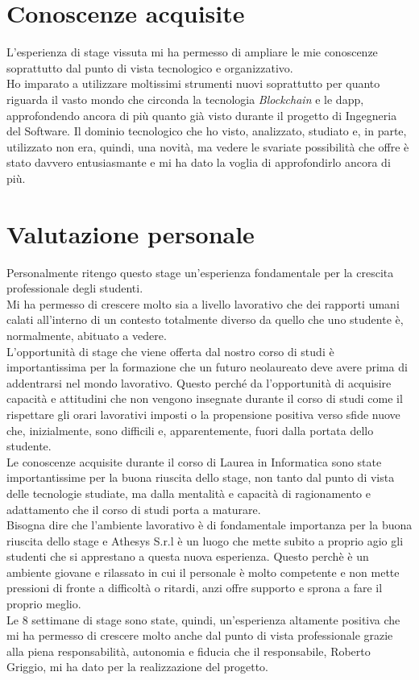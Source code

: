 \section{Conoscenze acquisite}
L'esperienza di stage vissuta mi ha permesso di ampliare le mie conoscenze soprattutto dal punto di vista tecnologico e organizzativo.\\
Ho imparato a utilizzare moltissimi strumenti nuovi soprattutto per quanto riguarda il vasto mondo che circonda la tecnologia \textit{Blockchain} e le \gls{dapp}, approfondendo ancora di più quanto già visto durante il progetto di Ingegneria del Software. Il dominio tecnologico che ho visto, analizzato, studiato e, in parte, utilizzato non era, quindi, una novità, ma vedere le svariate possibilità che offre è stato davvero entusiasmante e mi ha dato la voglia di approfondirlo ancora di più.
\section{Valutazione personale}
Personalmente ritengo questo stage un'esperienza fondamentale per la crescita professionale degli studenti.\\
Mi ha permesso di crescere molto sia a livello lavorativo che dei rapporti umani calati all'interno di un contesto totalmente diverso da quello che uno studente è, normalmente, abituato a vedere.\\
L'opportunità di stage che viene offerta dal nostro corso di studi è importantissima per la formazione che un futuro neolaureato deve avere prima di addentrarsi nel mondo lavorativo. Questo perché da l'opportunità di acquisire capacità e attitudini che non vengono insegnate durante il corso di studi come il rispettare gli orari lavorativi imposti o la propensione positiva verso sfide nuove che, inizialmente, sono difficili e, apparentemente, fuori dalla portata dello studente.\\
Le conoscenze acquisite durante il corso di Laurea in Informatica sono state importantissime per la buona riuscita dello stage, non tanto dal punto di vista delle tecnologie studiate, ma dalla mentalità e capacità di ragionamento e adattamento che il corso di studi porta a maturare.\\
Bisogna dire che l'ambiente lavorativo è di fondamentale importanza per la buona riuscita dello stage e Athesys S.r.l è un luogo che mette subito a proprio agio gli studenti che si apprestano a questa nuova esperienza. Questo perchè è un ambiente giovane e rilassato in cui il personale è molto competente e non mette pressioni di fronte a difficoltà o ritardi, anzi offre supporto e sprona a fare il proprio meglio.\\
Le 8 settimane di stage sono state, quindi, un'esperienza altamente positiva che mi ha permesso di crescere molto anche dal punto di vista professionale grazie alla piena responsabilità, autonomia e fiducia che il responsabile, Roberto Griggio, mi ha dato per la realizzazione del progetto.